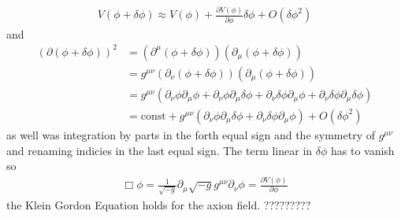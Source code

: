 \documentclass[a4paper]{article}
\begin{document}
\begin{align*}
    V(\phi + \delta \phi) \approx V(\phi) + \frac{\partial V(\phi)}{\partial \phi} \delta \phi + O(\delta \phi^2)
\end{align*}
and
\begin{align*}
      (\partial (\phi + \delta \phi))^2 &= (\partial^\mu (\phi + \delta \phi)) (\partial_\mu (\phi + \delta \phi)) \\
                                        &= g^{\mu \nu} (\partial_\nu (\phi + \delta \phi)) (\partial_\mu (\phi + \delta \phi)) \\
                                        &= g^{\mu \nu} (\partial_\nu \phi \partial_\mu \phi + \partial_\nu \phi \partial_\mu \delta \phi +
                                                        \partial_\nu \delta \phi \partial_\mu \phi + \partial_\nu \delta \phi \partial_\mu \delta \phi) \\
                                        &= \mathrm{const} + g^{\mu \nu} (\partial_\nu \phi \partial_\mu \delta \phi + \partial_\nu \delta \phi \partial_\mu \phi) + O(\delta \phi ^2)
\end{align*}
as well was integration by parts in the forth equal sign and the symmetry of $g^{\mu \nu}$ and renaming indicies in the last
equal sign.
The term linear in $\delta \phi$ has to vanish so
\begin{align}
    \label{eq:klein_gordon}
    \Box \phi = \frac{1}{\sqrt{-g}} \partial_\mu \sqrt{-g} g^{\mu \nu} \partial_\nu \phi = \frac{\partial V(\phi)}{\partial \phi}
\end{align}
the Klein Gordon Equation holds for the axion field. ?????????
\end{document}
